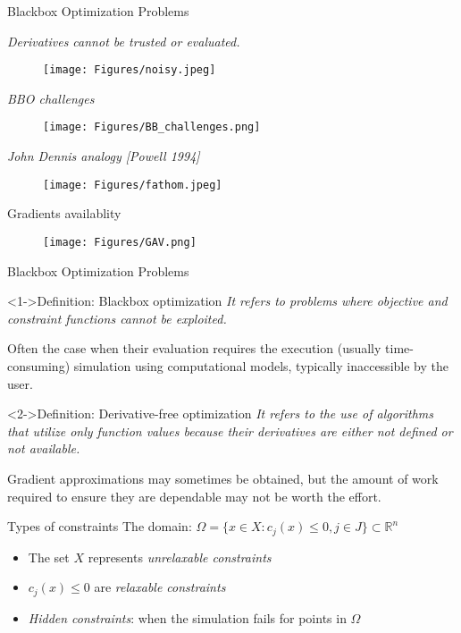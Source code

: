 \documentclass[8pt]{beamer}
\begin{document}
\begin{frame}[t]{Blackbox Optimization Problems}
{
{\it Derivatives cannot be trusted or evaluated.}
\begin{figure}[H]
\texttt{[image: Figures/noisy.jpeg]}
\end{figure}
}

{
{\it BBO challenges}

\begin{figure}[H]
\texttt{[image: Figures/BB\_challenges.png]}
\end{figure}

}
{
{\it John Dennis analogy [Powell 1994]}

\begin{figure}[H]
\texttt{[image: Figures/fathom.jpeg]}
\end{figure}

}
\end{frame}

\begin{frame}{Gradients availablity}
  \begin{figure}[H]
    \texttt{[image: Figures/GAV.png]}
    \end{figure}
\end{frame}

\begin{frame}[t]{Blackbox Optimization Problems} \vspace{4pt}
\begin{block}<1->{Definition: Blackbox optimization}
{\it It refers to problems where objective and constraint functions cannot be exploited.}
\end{block}
{
Often the case when their evaluation requires the execution (usually time-consuming) simulation using computational models, typically inaccessible by the user.
}
\vfill
\begin{block}<2->{Definition: Derivative-free optimization}
{\it It refers to the use of algorithms that utilize only function values because their derivatives are either not defined or not available.}
\end{block}
{
Gradient approximations may sometimes be obtained, but the amount of work required to ensure they are dependable may not be worth the effort.
}
\end{frame}
\begin{frame}{Types of constraints}
The domain: $\Omega= \{x \in X:c_{j}(x) \leq 0, j \in J \} \subset \mathbb{R}^{n}$
\begin{itemize}
  \item The set $X$ represents {\it \color{myblue} unrelaxable constraints}
  \item $c_{j}(x)\leq0$ are {\it \color{myblue} relaxable constraints}
  \item {\it \color{myblue} Hidden constraints}: when the simulation fails for points in $\Omega$
\end{itemize}

\end{frame}
\end{document}
